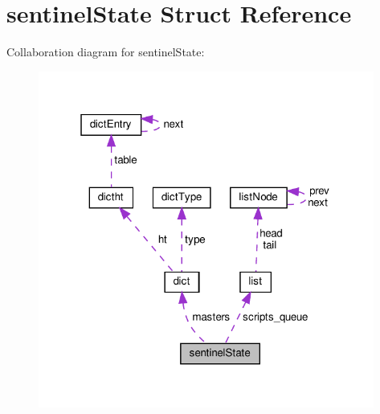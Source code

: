 \hypertarget{structsentinel_state}{}\section{sentinel\+State Struct Reference}
\label{structsentinel_state}


Collaboration diagram for sentinel\+State\+:
\nopagebreak
\begin{figure}[H]
\begin{center}
\leavevmode
\includegraphics[width=313pt]{structsentinel_state__coll__graph}
\end{center}
\end{figure}
